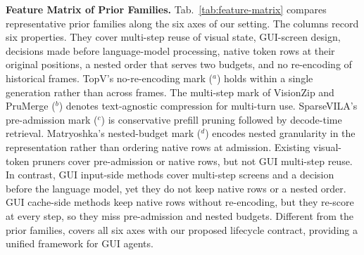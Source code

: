 \noindent\textbf{Feature Matrix of Prior Families.}
\label{app:feature-matrix}
Tab.~\ref{tab:feature-matrix} compares representative prior families along the six axes of our setting.
%
The columns record six properties. They cover multi-step reuse of visual state, GUI-screen design, decisions made before language-model processing, native token rows at their original positions, a nested order that serves two budgets, and no re-encoding of historical frames.
%
TopV's no-re-encoding mark ($^{a}$) holds within a single generation rather than across frames.
%
The multi-step mark of VisionZip and PruMerge ($^{b}$) denotes text-agnostic compression for multi-turn use.
%
SparseVILA's pre-admission mark ($^{c}$) is conservative prefill pruning followed by decode-time retrieval.
%
Matryoshka's nested-budget mark ($^{d}$) encodes nested granularity in the representation rather than ordering native rows at admission.
%
Existing visual-token pruners cover pre-admission or native rows, but not GUI multi-step reuse.
%
In contrast, GUI input-side methods cover multi-step screens and a decision before the language model, yet they do not keep native rows or a nested order.
%
GUI cache-side methods keep native rows without re-encoding, but they re-score at every step, so they miss pre-admission and nested budgets.
%
Different from the prior families, \method{} covers all six axes with our proposed lifecycle contract, providing a unified framework for GUI agents.


